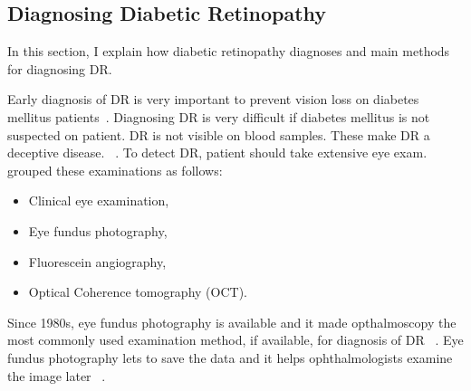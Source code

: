 \subsection{Diagnosing Diabetic Retinopathy}

In this section, I explain how diabetic retinopathy diagnoses and main methods for diagnosing DR.

Early diagnosis of DR is very important to prevent vision loss on diabetes mellitus patients~\cite{mankarautomatic}. Diagnosing DR is very difficult if diabetes mellitus is not suspected on patient. DR is not visible on blood samples. These make DR a deceptive disease. ~\cite{kauppi2010eye}. To detect DR, patient should take extensive eye exam. ~\cite{kauppi2010eye} grouped these examinations as follows:
\begin{itemize}
    \item Clinical eye examination,
    \item Eye fundus photography,
    \item Fluorescein angiography,
    \item Optical Coherence tomography (OCT).
\end{itemize}
Since 1980s, eye fundus photography is available and it made opthalmoscopy the most commonly used examination method, if available, for diagnosis of DR ~\cite{wendt2005screening}. Eye fundus photography lets to save the data and it helps ophthalmologists examine the image later ~\cite{hutchinson2000effectiveness}. 

